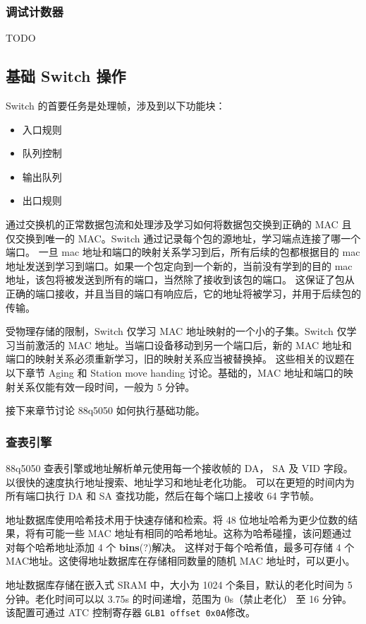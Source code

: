 \subsubsection{调试计数器}
TODO

\subsection{基础 Switch 操作}
Switch 的首要任务是处理帧，涉及到以下功能块：
\begin{itemize}
    \item 入口规则
    \item 队列控制
    \item 输出队列
    \item 出口规则
\end{itemize}

通过交换机的正常数据包流和处理涉及学习如何将数据包交换到正确的 MAC 且仅交换到唯一的 MAC。Switch 通过记录每个包的源地址，学习端点连接了哪一个端口。
一旦 mac 地址和端口的映射关系学习到后，所有后续的包都根据目的 mac 地址发送到学习到端口。如果一个包定向到一个新的，当前没有学到的目的 mac 地址，该包将被发送到所有的端口，当然除了接收到该包的端口。
这保证了包从正确的端口接收，并且当目的端口有响应后，它的地址将被学习，并用于后续包的传输。

受物理存储的限制，Switch 仅学习 MAC 地址映射的一个小的子集。Switch 仅学习当前激活的 MAC 地址。当端口设备移动到另一个端口后，新的 MAC 地址和端口的映射关系必须重新学习，旧的映射关系应当被替换掉。
这些相关的议题在以下章节 Aging 和 Station move handing 讨论。基础的，MAC 地址和端口的映射关系仅能有效一段时间，一般为 5 分钟。

接下来章节讨论 88q5050 如何执行基础功能。

\subsubsection{查表引擎}
88q5050 查表引擎或地址解析单元使用每一个接收帧的 DA， SA 及 VID 字段。以很快的速度执行地址搜索、地址学习和地址老化功能。
可以在更短的时间内为所有端口执行 DA 和 SA 查找功能，然后在每个端口上接收 64 字节帧。

地址数据库使用哈希技术用于快速存储和检索。将 48 位地址哈希为更少位数的结果，将有可能一些 MAC 地址有相同的哈希地址。这称为哈希碰撞，该问题通过对每个哈希地址添加 4 个 \textbf{bins}(?)解决。
这样对于每个哈希值，最多可存储 4 个 MAC地址。这使得地址数据库在存储相同数量的随机 MAC 地址时，可以更小。

地址数据库存储在嵌入式 SRAM 中，大小为 1024 个条目，默认的老化时间为 5 分钟。老化时间可以以 3.75s 的时间递增，范围为 0s（禁止老化） 至 16 分钟。
该配置可通过 ATC 控制寄存器 \lstinline{GLB1 offset 0x0A}修改。

